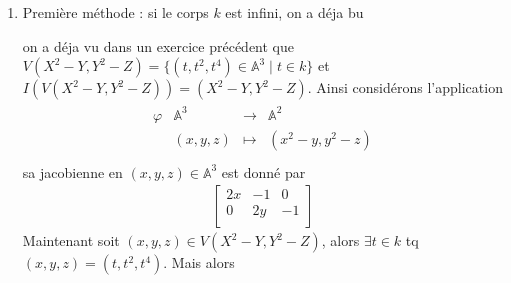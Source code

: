 \documentclass[11pt]{article}
\begin{document}
    \begin{enumerate}
        \item Première méthode : si le corps $k$ est infini, on a déja bu
        
        
        on a déja vu dans un exercice précédent que $V(X^2 - Y, Y^2 - Z) = \{(t,t^2,t^4) \in \mathbb{A}^3 \mid t \in k\}$ et $I(V(X^2 - Y, Y^2 - Z)) = (X^2 - Y, Y^2 - Z)$. Ainsi considérons l'application
        \begin{align*}
            \begin{array}{cccc}
                \varphi & \mathbb{A}^3 & \to & \mathbb{A}^2 \\
                & (x,y,z) & \mapsto & (x^2 - y, y^2 - z) \\
            \end{array}
        \end{align*}
        sa jacobienne en $(x,y,z) \in \mathbb{A}^3$ est donné par
        \begin{align*}
            \begin{bmatrix}
                2x & -1 & 0 \\
                0 & 2y & -1 \\
            \end{bmatrix}
        \end{align*}
        Maintenant soit $(x,y,z) \in V(X^2 - Y, Y^2 - Z)$, alors $\exists t \in k$ tq $(x,y,z) = (t, t^2, t^4)$. Mais alors
        
    \end{enumerate}
\end{document}
